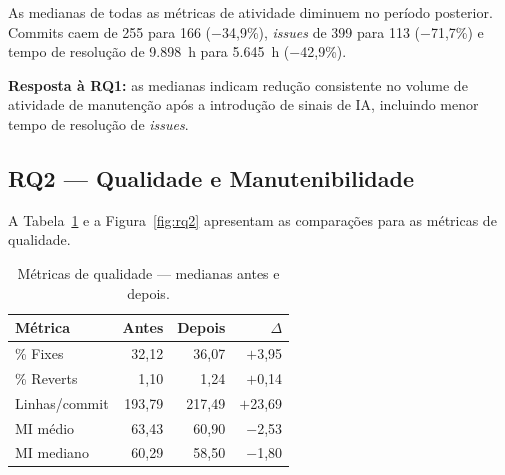 \documentclass[12pt,a4paper,twocolumn]{article}
\begin{document}
As medianas de todas as métricas de atividade diminuem no período posterior.
Commits caem de 255 para 166 ($-$34,9\%), \textit{issues} de 399 para 113
($-$71,7\%) e tempo de resolução de 9.898~h para 5.645~h ($-$42,9\%).

\textbf{Resposta à RQ1:} as medianas indicam redução consistente no volume de atividade
de manutenção após a introdução de sinais de IA, incluindo menor tempo de resolução de
\textit{issues}.

\subsection{RQ2 --- Qualidade e Manutenibilidade}

A Tabela~\ref{tab:rq2} e a Figura~\ref{fig:rq2} apresentam as comparações
para as métricas de qualidade.

\begin{table}[H]
\centering
\caption{Métricas de qualidade — medianas antes e depois.}
\label{tab:rq2}
\small
\setlength{\tabcolsep}{4pt}
\begin{tabular}{lrrr}
\toprule
\textbf{Métrica} & \textbf{Antes} & \textbf{Depois} & \textbf{$\Delta$} \\
\midrule
\% Fixes            & 32,12 & 36,07 & \textcolor{accentgreen}{$+$3,95} \\
\% Reverts          &  1,10 &  1,24 & \textcolor{accentred}{$+$0,14} \\
Linhas/commit       & 193,79& 217,49& \textcolor{accentgreen}{$+$23,69} \\
MI médio            & 63,43 & 60,90 & \textcolor{accentred}{$-$2,53} \\
MI mediano          & 60,29 & 58,50 & \textcolor{accentred}{$-$1,80} \\
\bottomrule
\end{tabular}
\end{table}
\end{document}
